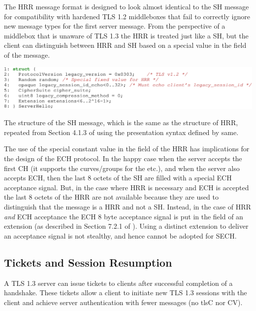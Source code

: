 The \ac{HRR} message format is designed to look almost identical to the \ac{SH} message for compatibility with hardened \ac{TLS} 1.2 middleboxes that fail to correctly ignore new message types for the first server message.
From the perspective of a middlebox
that is unaware of \ac{TLS} 1.3
the \ac{HRR} is treated just like a \ac{SH},
but the client can distinguish between \ac{HRR} and \ac{SH} based on a special value in the  field of the message.

\begin{listing}[hb]
    \centering
    \includegraphics[width=\linewidth]{figure/ServerHello-struct.pdf}
    \captionsetup{width=.8\linewidth} 
    \caption[\ac{SH} and \ac{HRR} Structures]{The structure of the \ac{SH} message, which is the same as the structure of \ac{HRR}, repeated from Section 4.1.3 of \cite{esni} using the presentation syntax defined by same.}
    \label{lst:server-hello-struct}
\end{listing}

The use of the special constant value in the  field of the \ac{HRR} has implications for the design of the \ac{ECH} protocol.
In the happy case when the server accepts the first \ac{CH}
(it supports the curves/groups for the  etc.),
and when the server also accepts \ac{ECH}, then the last 8 octets of the \ac{SH} are filled with a special ECH acceptance signal.
But, in the case where \ac{HRR} is necessary and \ac{ECH} is accepted
the last 8 octets of the \ac{HRR}
are not available because they are used to distinguish that the message is a \ac{HRR} and not a \ac{SH}.
Instead, in the case of \ac{HRR} {\em and} \ac{ECH} acceptance
the \ac{ECH} 8 byte acceptance signal is put in the
 field of an  extension
(as described in Section 7.2.1 of \cite{esni}).
Using a distinct extension to deliver an acceptance signal is not stealthy, and hence cannot be adopted for \ac{SECH}.


\subsection{Tickets and Session Resumption}

A TLS 1.3 server can issue tickets to clients after successful completion of a handshake.
These tickets allow a client to initiate new \ac{TLS} 1.3
sessions with the client and achieve server authentication
with fewer messages (no \ac{tlsC} nor \ac{CV}).


